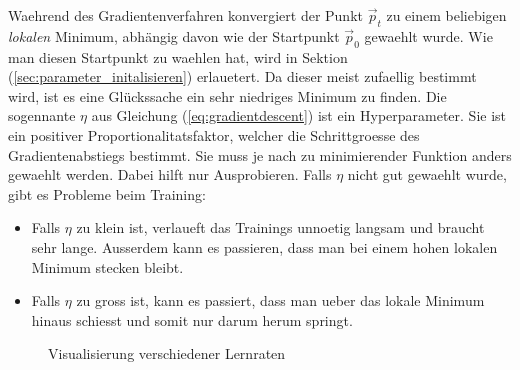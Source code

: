 Waehrend des Gradientenverfahren konvergiert der Punkt $\vec{p}_t$ zu einem
beliebigen \textit{lokalen} Minimum, abhängig davon wie der Startpunkt
$\vec{p}_0$ gewaehlt wurde.
Wie man diesen Startpunkt zu waehlen hat, wird in Sektion
(\ref{sec:parameter_initalisieren}) erlauetert.
Da dieser meist zufaellig bestimmt wird, ist es eine Glückssache ein sehr niedriges Minimum zu finden.
\para{}
Die sogennante  $\eta$ aus Gleichung (\ref{eq:gradientdescent}) ist ein Hyperparameter.
Sie ist ein positiver Proportionalitatsfaktor, welcher die Schrittgroesse des
Gradientenabstiegs bestimmt. Sie muss je nach zu minimierender Funktion anders gewaehlt werden.
Dabei hilft nur Ausprobieren. Falls $\eta$ nicht gut gewaehlt wurde, gibt es Probleme beim Training:
\begin{itemize}
\item{Falls $\eta$ zu klein ist, verlaueft das Trainings unnoetig langsam und braucht sehr lange.
    Ausserdem kann es passieren, dass man bei einem hohen lokalen Minimum stecken bleibt.}

\item{Falls $\eta$ zu gross ist, kann es passiert, dass man ueber das lokale
    Minimum hinaus schiesst und somit nur darum herum springt.}
\end{itemize}

\begin{figure}[h!]
  \centering
  \caption{Visualisierung verschiedener Lernraten}
\end{figure}

\para{}
\cite{Nielsen}

